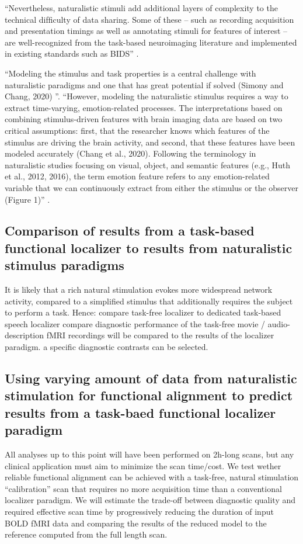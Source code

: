 ``Nevertheless, naturalistic stimuli add additional layers of complexity to the
technical difﬁculty of data sharing. Some of these – such as recording
acquisition and presentation timings as well as annotating stimuli for features
of interest – are well-recognized from the task-based neuroimaging literature
and implemented in existing standards such as BIDS'' \citep{dupre2020nature}.


``Modeling the stimulus and task properties is a central challenge with
naturalistic paradigms and one that has great potential if solved (Simony and
Chang, 2020) \citep{saarimaki2021naturalistic}''.
%
``However, modeling the naturalistic stimulus requires a way to extract
time-varying, emotion-related processes. The interpretations based on combining
stimulus-driven features with brain imaging data are based on two critical
assumptions: first, that the researcher knows which features of the stimulus are
driving the brain activity, and second, that these features have been modeled
accurately (Chang et al., 2020). Following the terminology in naturalistic
studies focusing on visual, object, and semantic features (e.g., Huth et al.,
2012, 2016), the term emotion feature refers to any emotion-related variable
that we can continuously extract from either the stimulus or the observer
(Figure 1)'' \citep{saarimaki2021naturalistic}.


\subsection{Comparison of results from a task-based functional localizer to results from naturalistic stimulus paradigms}
%
It is likely that a rich natural stimulation evokes more widespread network
activity, compared to a simplified stimulus that additionally requires the
subject to perform a task.
%
Hence: compare task-free localizer to dedicated task-based speech localizer
%
compare diagnostic performance of the task-free movie / audio-description fMRI
recordings will be compared to the results of the localizer paradigm.
%
a specific diagnostic contrasts can be selected.


\subsection{Using varying amount of data from naturalistic stimulation for
functional alignment  to predict results from a task-baed functional localizer
paradigm}
%
All analyses up to this point will have been performed on 2h-long scans, but any
clinical application must aim to minimize the scan time/cost.
%
We test wether reliable functional alignment can be achieved with a task-free,
natural stimulation ``calibration” scan that requires no more acquisition time
than a conventional localizer paradigm.
%
We will estimate the trade-off between diagnostic quality and required effective
scan time by progressively reducing the duration of input BOLD fMRI data and
comparing the results of the reduced model to the reference computed from the
full length scan.

